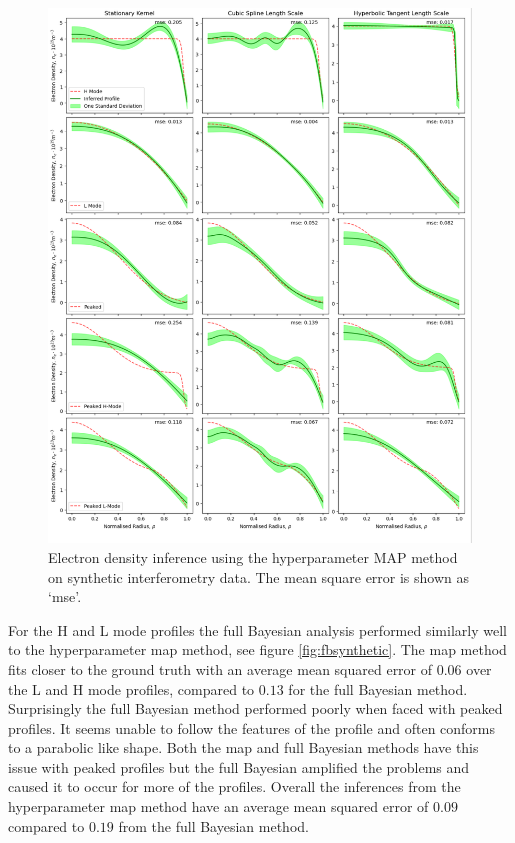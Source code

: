 \begin{figure}[H]
    \centering
    \includegraphics[width=\textwidth]{images/Final/MAPsynthetic_final_all.png}
    \caption{Electron density inference using the hyperparameter MAP method on synthetic interferometry data. The mean square error is shown as `mse'.}
    \label{fig:mapsynthetic}
\end{figure}
\restoregeometry 

For the H and L mode profiles the full Bayesian analysis performed similarly well to the hyperparameter \gls{map} method, see figure \ref{fig:fbsynthetic}. The \gls{map} method fits closer to the ground truth with an average mean squared error of $0.06$ over the L and H mode profiles, compared to $0.13$ for the full Bayesian method. Surprisingly the full Bayesian method performed poorly when faced with peaked profiles. It seems unable to follow the features of the profile and often conforms to a parabolic like shape. Both the \gls{map} and full Bayesian methods have this issue with peaked profiles but the full Bayesian amplified the problems and caused it to occur for more of the profiles. Overall the inferences from the hyperparameter \gls{map} method have an average mean squared error of $0.09$ compared to $0.19$ from the full Bayesian method.

